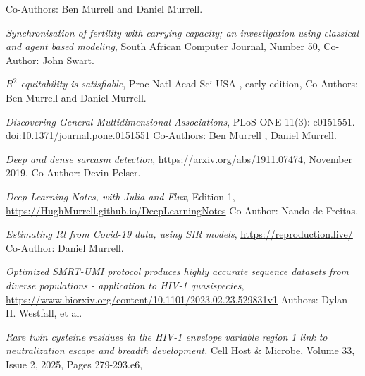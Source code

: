 \begin{description}
\begin{description}
\begin{description}
       Co-Authors: Ben Murrell and Daniel Murrell.\newline
\item[2013:]
       {\it Synchronisation of fertility with carrying capacity; 
       an investigation using classical and agent based modeling},
       South African Computer Journal, Number 50,
       Co-Author: John Swart. \newline
\item[2014:]
         {\it $R^2$-equitability is satisfiable}, Proc Natl Acad Sci USA , early edition, 
         Co-Authors: Ben Murrell and Daniel Murrell. \newline
\item[2016:]
         {\it Discovering General Multidimensional Associations},
         PLoS ONE 11(3): e0151551. doi:10.1371/journal.pone.0151551
	Co-Authors: Ben Murrell , Daniel Murrell. \newline
\item[2019:]
         {\it Deep and dense sarcasm detection},
         \url{https://arxiv.org/abs/1911.07474}, November 2019,
         Co-Author: Devin Pelser. \newline
 \item[2019:]
 	{\it Deep Learning Notes, with Julia and Flux}, Edition 1,
	\url{https://HughMurrell.github.io/DeepLearningNotes}
	Co-Author: Nando de Freitas. \newline \newline
\item[2020:]
	{\it Estimating Rt from Covid-19 data, using SIR models},
	\url{https://reproduction.live/}
	Co-Author: Daniel Murrell. \newline
\item[2023:]
         {\it Optimized SMRT-UMI protocol produces highly accurate 
         sequence datasets from diverse populations - application to HIV-1 quasispecies},
         \url{https://www.biorxiv.org/content/10.1101/2023.02.23.529831v1}
         Authors: Dylan H. Westfall, et al. \newline
\item[2025:]
         {\it Rare twin cysteine residues in the HIV-1 envelope variable region 1 
         link to neutralization escape and breadth development.} 
         Cell Host \& Microbe, Volume 33, Issue 2, 2025, Pages 279-293.e6,

\end{description}
\end{description}
\end{description}
